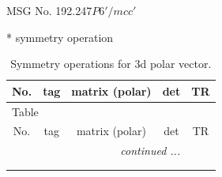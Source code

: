 \documentclass[fleqn,8pt]{jsarticle}
\begin{document}
\setcounter{MaxMatrixCols}{32}

\renewcommand{\tablename}{Table~}
\renewcommand{\figurename}{Figure~}
\begin{center}
\LARGE
MSG No. 192.247\quad$P6'/mcc'$
\end{center}
* symmetry operation
\renewcommand{\arraystretch}{1.3}
\begin{longtable}{ccccc}
\caption{Symmetry operations for 3d polar vector.}
 \\
 \hline \hline
No. & tag & matrix (polar) & det & TR \\ \hline \endfirsthead

\multicolumn{4}{l}{\tablename\ \thetable{}} \\
 \hline \hline
No. & tag & matrix (polar) & det & TR \\ \hline \endhead

 \hline \hline
\multicolumn{4}{r}{\footnotesize\it continued ...} \\ \endfoot

 \hline \hline
\multicolumn{4}{r}{} \\ \endlastfoot


\end{longtable}
\end{document}
